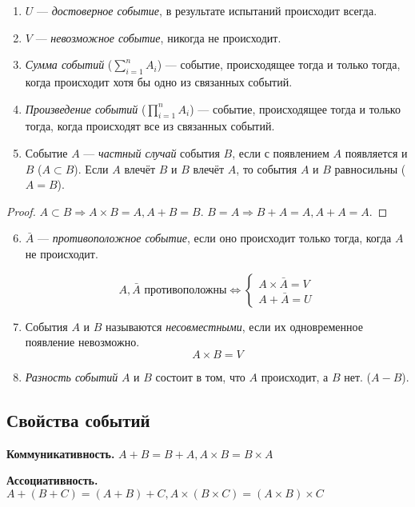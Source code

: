 \begin{enumerate}
\item $U$ --- \textit{достоверное событие}, в результате испытаний происходит всегда.
\item $V$ --- \textit{невозможное событие}, никогда не происходит.
\item \textit{Сумма событий} ($\sum\limits_{i=1}^n A_i$) --- событие, происходящее тогда и только тогда, когда происходит хотя бы одно из связанных событий.
\item \textit{Произведение событий} ($\prod\limits_{i=1}^n A_i$) --- событие, происходящее тогда и только тогда, когда происходят все из связанных событий.
\item Событие $A$ --- \textit{частный случай} события $B$, если с появлением $A$ появляется и $B$ ($A \subset B$). Если $A$ влечёт $B$ и $B$ влечёт $A$, то события $A$ и $B$ равносильны ($A = B$).
\end{enumerate}
\begin{proof}
  $A \subset B \Rightarrow A\times B = A, A + B = B.$
  $B = A \Rightarrow B + A = A, A + A = A.$
\end{proof}
\begin{enumerate}
\setcounter{enumi}{5}
\item $\bar{A}$ --- \textit{противоположное событие}, если оно происходит только тогда, когда $A$ не происходит.

\[
A  ,  \bar{A} \text{ противоположны} \Leftrightarrow
 \begin{cases}
   A\times \bar{A} = V \\
   A + \bar{A} = U
 \end{cases}
\]

\item События $A$ и $B$ называются \textit{несовместными}, если их одновременное появление невозможно.
$$A\times B = V$$

\item \textit{Разность событий} $A$ и $B$ состоит в том, что $A$ происходит, а $B$ нет. ($A - B$).
\end{enumerate}

\subsection{Свойства событий}
  \textbf{Коммуникативность.} $A + B = B + A, A\times B = B\times A$
  \smallskip

  \textbf{Ассоциативность.} $A + (B + C)=(A + B) + C, A\times (B\times C) = (A\times B)\times C$
  \smallskip

